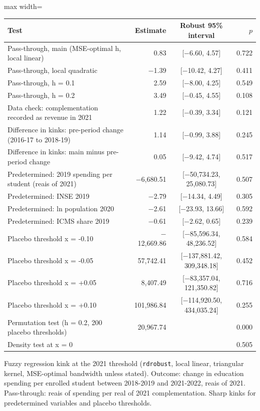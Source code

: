 \begin{adjustbox}{max width=\linewidth}
\begin{tabular}{lrcr}
\toprule
Test & Estimate & Robust 95\% interval & $p$ \\
\midrule
Pass-through, main (MSE-optimal h, local linear) & 0.83 & [$-$6.60, 4.57] & 0.722 \\
Pass-through, local quadratic & $-$1.39 & [$-$10.42, 4.27] & 0.411 \\
Pass-through, h = 0.1 & 2.59 & [$-$8.00, 4.25] & 0.549 \\
Pass-through, h = 0.2 & 3.49 & [$-$0.45, 4.55] & 0.108 \\
Data check: complementation recorded as revenue in 2021 & 1.22 & [$-$0.39, 3.34] & 0.121 \\
Difference in kinks: pre-period change (2016-17 to 2018-19) & 1.14 & [$-$0.99, 3.88] & 0.245 \\
Difference in kinks: main minus pre-period change & 0.05 & [$-$9.42, 4.74] & 0.517 \\
Predetermined: 2019 spending per student (reais of 2021) & $-$6{,}680.51 & [$-$50{,}734.23, 25{,}080.73] & 0.507 \\
Predetermined: INSE 2019 & $-$2.79 & [$-$14.34, 4.49] & 0.305 \\
Predetermined: ln population 2020 & $-$2.61 & [$-$23.93, 13.66] & 0.592 \\
Predetermined: ICMS share 2019 & $-$0.61 & [$-$2.62, 0.65] & 0.239 \\
Placebo threshold x = -0.10 & $-$12{,}669.86 & [$-$85{,}596.34, 48{,}236.52] & 0.584 \\
Placebo threshold x = -0.05 & 57{,}742.41 & [$-$137{,}881.42, 309{,}348.18] & 0.452 \\
Placebo threshold x = +0.05 & 8{,}407.49 & [$-$83{,}357.04, 121{,}350.82] & 0.716 \\
Placebo threshold x = +0.10 & 101{,}986.84 & [$-$114{,}920.50, 434{,}035.24] & 0.255 \\
Permutation test (h = 0.2, 200 placebo thresholds) & 20{,}967.74 &  & 0.000 \\
Density test at x = 0 &  &  & 0.505 \\
\bottomrule
\end{tabular}
\end{adjustbox}
\par\smallskip\begin{minipage}{0.95\linewidth}\footnotesize Fuzzy regression kink at the 2021 threshold (\texttt{rdrobust}, local linear, triangular kernel, MSE-optimal bandwidth unless stated). Outcome: change in education spending per enrolled student between 2018-2019 and 2021-2022, reais of 2021. Pass-through: reais of spending per real of 2021 complementation. Sharp kinks for predetermined variables and placebo thresholds.\end{minipage}
